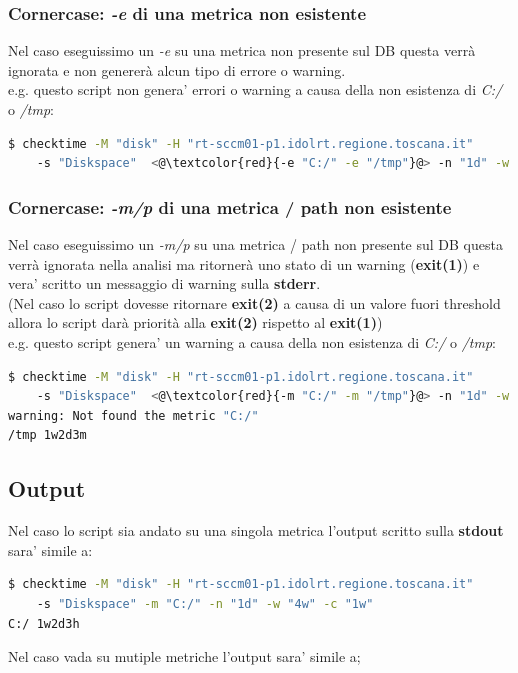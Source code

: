 \documentclass{article}
\begin{document}
\subsubsection*{Cornercase: \textit{-e} di una metrica non esistente}
Nel caso eseguissimo un \textit{-e} su una metrica non presente sul DB questa verrà ignorata e non genererà alcun tipo di errore o warning.
\\
e.g. questo script non genera' errori o warning a causa della non esistenza di \textit{C:/} o \textit{/tmp}: 
\begin{lstlisting}[language=Bash]
$ checktime -M "disk" -H "rt-sccm01-p1.idolrt.regione.toscana.it" 
    -s "Diskspace"  <@\textcolor{red}{-e "C:/" -e "/tmp"}@> -n "1d" -w "4w" -c "1w"
\end{lstlisting}


\subsubsection*{Cornercase: \textit{-m/p} di una metrica / path non esistente}
Nel caso eseguissimo un \textit{-m/p} su una metrica / path non presente sul DB questa verrà ignorata nella analisi ma ritornerà uno stato di un warning (\textbf{exit(1)}) e vera' scritto un messaggio di warning sulla \textbf{stderr}.\\
(Nel caso lo script dovesse ritornare \textbf{exit(2)} a causa di un valore fuori threshold allora lo script darà priorità alla \textbf{exit(2)} rispetto al \textbf{exit(1)})
\\
e.g. questo script genera' un warning a causa della non esistenza di \textit{C:/} o \textit{/tmp}: 
\begin{lstlisting}[language=Bash]
$ checktime -M "disk" -H "rt-sccm01-p1.idolrt.regione.toscana.it" 
    -s "Diskspace"  <@\textcolor{red}{-m "C:/" -m "/tmp"}@> -n "1d" -w "4w" -c "1w"
warning: Not found the metric "C:/"
/tmp 1w2d3m
\end{lstlisting}



\clearpage

\subsection{Output}
Nel caso lo script sia andato su una singola metrica l'output scritto sulla \textbf{stdout} sara' simile a:
\begin{lstlisting}[language=Bash]
$ checktime -M "disk" -H "rt-sccm01-p1.idolrt.regione.toscana.it" 
    -s "Diskspace" -m "C:/" -n "1d" -w "4w" -c "1w"
C:/ 1w2d3h
\end{lstlisting}
Nel caso vada su mutiple metriche l'output sara' simile a;
\end{document}
